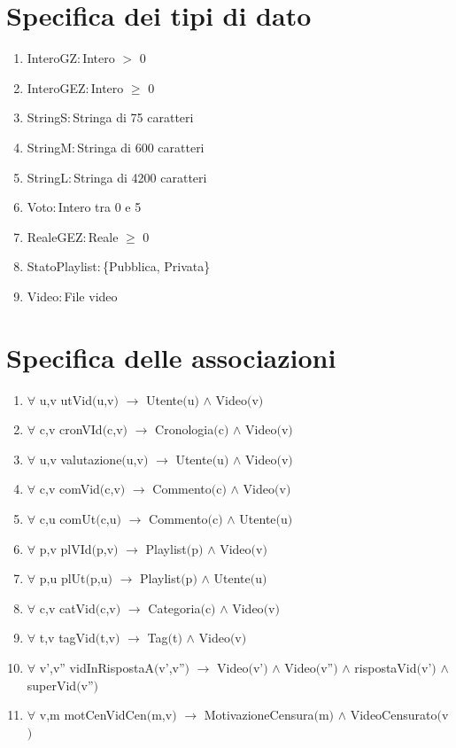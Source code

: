 \documentclass{article}
\begin{document}
\newpage

\section{\label{sec:TipoDiDato}Specifica dei tipi di dato}
\begin{enumerate}
    \item\label{sec:TipoInteroGZ} InteroGZ$: $Intero $>$ 0
    \item\label{sec:TipoInteroGEZ} InteroGEZ$: $Intero $\geq$ 0
    \item\label{sec:TipoStringS} StringS$: $Stringa di 75 caratteri
    \item\label{sec:TipoStringM} StringM$: $Stringa di 600 caratteri
    \item\label{sec:TipoStringL} StringL$: $Stringa di 4200 caratteri
    \item\label{sec:TipoVoto} Voto$: $Intero tra 0 e 5
    \item\label{sec:TipoRealeGEZ} RealeGEZ$: $Reale $\geq$ 0
    \item\label{sec:TipoStatoPlaylist} StatoPlaylist$: $\{Pubblica, Privata\}
    \item\label{sec:TipoVideo} Video$: $File video
\end{enumerate}

\newpage

\section{\label{sec:Associazioni}Specifica delle associazioni}
\begin{enumerate}
    \item $\forall$ u,v utVid$($u,v$)$ $\rightarrow$ Utente$($u$)$ $\land$ Video$($v$)$
    \item $\forall$ c,v cronVId$($c,v$)$ $\rightarrow$ Cronologia$($c$)$ $\land$ Video$($v$)$
    \item $\forall$ u,v valutazione$($u,v$)$ $\rightarrow$ Utente$($u$)$ $\land$ Video$($v$)$
    \item $\forall$ c,v comVid$($c,v$)$ $\rightarrow$ Commento$($c$)$ $\land$ Video$($v$)$
    \item $\forall$ c,u comUt$($c,u$)$ $\rightarrow$ Commento$($c$)$ $\land$ Utente$($u$)$
    \item $\forall$ p,v plVId$($p,v$)$ $\rightarrow$ Playlist$($p$)$ $\land$ Video$($v$)$
    \item $\forall$ p,u plUt$($p,u$)$ $\rightarrow$ Playlist$($p$)$ $\land$ Utente$($u$)$
    \item $\forall$ c,v catVid$($c,v$)$ $\rightarrow$ Categoria$($c$)$ $\land$ Video$($v$)$
    \item $\forall$ t,v tagVid$($t,v$)$ $\rightarrow$ Tag$($t$)$ $\land$ Video$($v$)$
    \item $\forall$ v',v'' vidInRispostaA$($v',v''$)$ $\rightarrow$ Video$($v'$)$ $\land$ Video$($v''$)$ $\land$ rispostaVid$($v'$)$ $\land$ superVid$($v''$)$
    \item $\forall$ v,m motCenVidCen$($m,v$)$ $\rightarrow$ MotivazioneCensura$($m$)$ $\land$ VideoCensurato$($v$)$
\end{enumerate}
\end{document}
